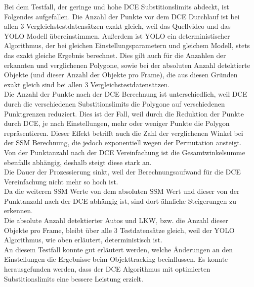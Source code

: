 {{		Bei dem Testfall, der geringe und hohe DCE Substitionslimits abdeckt, ist Folgendes aufgefallen. Die Anzahl der Punkte vor dem DCE Durchlauf ist bei allen 3 Vergleichstestdatensätzen exakt gleich, weil das Quellvideo und das YOLO Modell übereinstimmen. Außerdem ist YOLO ein deterministischer Algorithmus, der bei gleichen Einstellungsparametern und gleichem Modell, stets das exakt gleiche Ergebnis berechnet. Dies gilt auch für die Anzahlen der erkannten und verglichenen Polygone, sowie bei der absoluten Anzahl detektierte Objekte (und dieser Anzahl der Objekte pro Frame), die aus diesen Gründen exakt gleich sind bei allen 3 Vergleichstestdatensätzen. \\
		Die Anzahl der Punkte nach der DCE Berechnung ist unterschiedlich, weil DCE durch die verschiedenen Substitionslimits die Polygone auf verschiedenen Punktgrenzen reduziert. Dies ist der Fall, weil durch die Reduktion der Punkte durch DCE, je nach Einstellungen, mehr oder weniger Punkte die Polygon repräsentieren. Dieser Effekt betrifft auch die Zahl der verglichenen Winkel bei der SSM Berechnung, die jedoch exponentiell wegen der Permutation ansteigt. Von der Punktanzahl nach der DCE Vereinfachung ist die Gesamtwinkelsumme ebenfalls abhängig, deshalb steigt diese stark an. \\
		Die Dauer der Prozessierung sinkt, weil der Berechnungsaufwand für die DCE Vereinfachung nicht mehr so hoch ist. \\
		Da die weiteren SSM Werte von dem absoluten SSM Wert und dieser von der Punktanzahl nach der DCE abhängig ist, sind dort ähnliche Steigerungen zu erkennen. \\
		Die absolute Anzahl detektierter Autos und LKW, bzw. die Anzahl dieser Objekte pro Frame, bleibt über alle 3 Testdatensätze gleich, weil der YOLO Algorithmus, wie oben erläutert, deterministisch ist. \\
		An diesem Testfall konnte gut erläutert werden, welche Änderungen an den Einstellungen die Ergebnisse beim Objekttracking beeinflussen. Es konnte herausgefunden werden, dass der DCE Algorithmus mit optimierten Substitionslimits eine bessere Leistung erzielt. \\


}}
